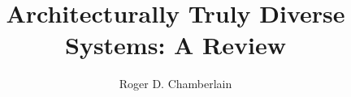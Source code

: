 \documentclass[preprint,11pt]{elsarticle}
\begin{document}
\begin{frontmatter}
\title{Architecturally Truly Diverse Systems: A Review}

\author{Roger D. Chamberlain}
\address{Washington University in St. Louis, St. Louis, Missouri, USA}

\end{frontmatter}










\end{document}
